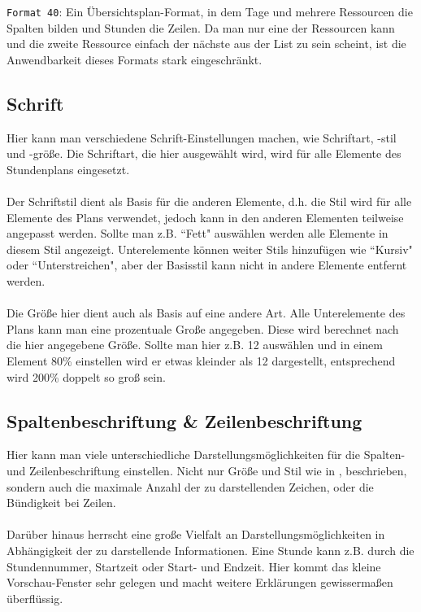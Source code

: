 \noindent
\texttt{Format 40}: Ein Übersichtsplan-Format, in dem Tage und mehrere Ressourcen die Spalten bilden und Stunden die Zeilen. Da man nur eine der Ressourcen kann und die zweite Ressource einfach der nächste aus der List zu sein scheint, ist die Anwendbarkeit dieses Formats stark eingeschränkt.\\

\subsection{Schrift}
\label{sec:schrift}

Hier kann man verschiedene Schrift-Einstellungen machen, wie Schriftart, -stil und -größe. Die Schriftart, die hier ausgewählt wird, wird für alle Elemente des Stundenplans eingesetzt.\\
\\
Der Schriftstil dient als Basis für die anderen Elemente, d.h. die Stil wird für alle Elemente des Plans verwendet, jedoch kann in den anderen Elementen teilweise angepasst werden. Sollte man z.B. ``Fett" \hspace{1pt} auswählen werden alle Elemente in diesem Stil angezeigt. Unterelemente können weiter Stils hinzufügen wie ``Kursiv" \hspace{1pt} oder ``Unterstreichen", aber der Basisstil kann nicht in andere Elemente entfernt werden.\\
\\
Die Größe hier dient auch als Basis auf eine andere Art. Alle Unterelemente des Plans kann man eine prozentuale Große angegeben. Diese wird berechnet nach die hier angegebene Größe. Sollte man hier z.B. 12 auswählen und in einem Element 80\% einstellen wird er etwas kleinder als 12 dargestellt, entsprechend wird 200\% doppelt so groß sein.

\subsection{Spaltenbeschriftung \& Zeilenbeschriftung}

Hier kann man viele unterschiedliche Darstellungsmöglichkeiten für die Spalten- und Zeilenbeschriftung einstellen. Nicht nur Größe und Stil wie in , beschrieben, sondern auch die maximale Anzahl der zu darstellenden Zeichen, oder die Bündigkeit bei Zeilen.\\
\\
Darüber hinaus herrscht eine große Vielfalt an Darstellungsmöglichkeiten in Abhängigkeit der zu darstellende Informationen. Eine Stunde kann z.B. durch die Stundennummer, Startzeit oder Start- und Endzeit. Hier kommt das kleine Vorschau-Fenster sehr gelegen und macht weitere Erklärungen gewissermaßen überflüssig.

